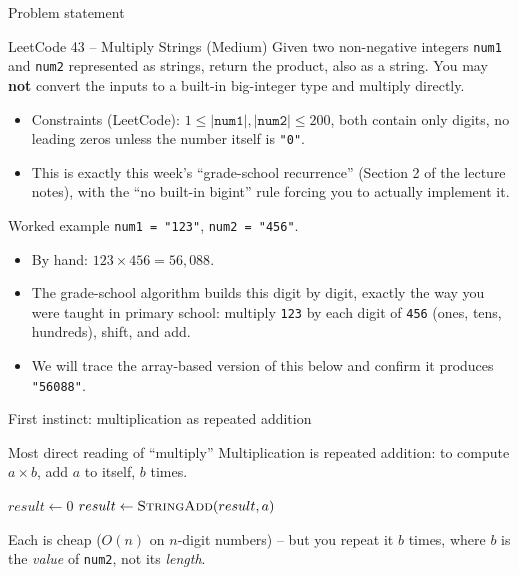 \documentclass[11pt,aspectratio=169]{beamer}
\begin{document}
\begin{frame}{Problem statement}
  \begin{block}{LeetCode 43 -- Multiply Strings (\textcolor{blue!50!black}{Medium})}
    Given two non-negative integers \texttt{num1} and \texttt{num2} represented as
    strings, return the product, also as a string. You may \textbf{not} convert the
    inputs to a built-in big-integer type and multiply directly.
  \end{block}
  \begin{itemize}
    \item Constraints (LeetCode): $1 \le |\texttt{num1}|, |\texttt{num2}| \le 200$, both
    contain only digits, no leading zeros unless the number itself is \texttt{"0"}.
    \item This is exactly this week's ``grade-school recurrence'' (Section 2 of the
    lecture notes), with the ``no built-in bigint'' rule forcing you to actually
    implement it.
  \end{itemize}
\end{frame}

\begin{frame}{Worked example}
  \texttt{num1 = "123"}, \texttt{num2 = "456"}.
  \begin{itemize}
    \item By hand: $123 \times 456 = 56{,}088$.
    \item The grade-school algorithm builds this digit by digit, exactly the way you
    were taught in primary school: multiply \texttt{123} by each digit of
    \texttt{456} (ones, tens, hundreds), shift, and add.
    \item We will trace the array-based version of this below and confirm it produces
    \texttt{"56088"}.
  \end{itemize}
\end{frame}

\begin{frame}{First instinct: multiplication as repeated addition}
  \begin{block}{Most direct reading of ``multiply''}
    Multiplication is repeated addition: to compute $a \times b$, add $a$ to itself,
    $b$ times.
  \end{block}
  \begin{algorithmic}[1]
      \State $result \gets 0$
       
        \State $result \gets \Call{StringAdd}{result, a}$
      \EndFor
    \EndFunction
  \end{algorithmic}
  Each  is cheap ($O(n)$ on $n$-digit numbers) -- but you repeat it
  $b$ times, where $b$ is the \emph{value} of \texttt{num2}, not its \emph{length}.
\end{frame}
\end{document}
